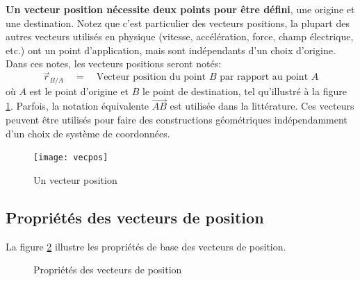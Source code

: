 \textbf{Un vecteur position nécessite deux points pour être défini}, une origine et une destination. Notez que c'est particulier des vecteurs positions, la plupart des autres vecteurs utilisés en physique (vitesse, accélération, force, champ électrique, etc.) ont un point d'application, mais sont indépendants d'un choix d’origine. Dans ces notes, les vecteurs positions seront notés:
\begin{equation}
	\vec{r}_{B/A}  \quad =  \quad \text{Vecteur position du point $B$ par rapport au point $A$}
\end{equation}
où $A$ est le point d'origine et $B$ le point de destination, tel qu'illustré à la figure \ref{fig:vecpos}. Parfois, la notation équivalente $\vec{AB}$ est utilisée dans la littérature.
Ces vecteurs  peuvent être utilisés pour faire des constructions géométriques indépendamment d'un choix de système de coordonnées.
%
\begin{figure}[htb]
	\centering
	\texttt{[image: vecpos]}
	\caption{Un vecteur position}
	\label{fig:vecpos}
\end{figure}
%

\subsection{Propriétés des vecteurs de position}
\label{sec:vecposprop}
%
La figure \ref{fig:vecposprop} illustre les propriétés de base des vecteurs de position.
%
\begin{figure}[htbp]
	\centering
	\hspace{5pt}
	\hspace{5pt}
	\caption{Propriétés des vecteurs de position}
	\label{fig:vecposprop}
\end{figure}
%
